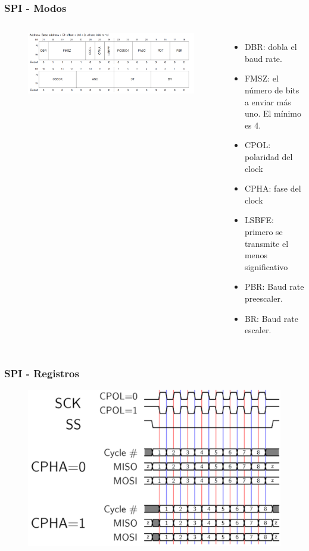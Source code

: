 \documentclass[10.5pt,scale=1.0,t,aspectratio=169,hyperref={pdfpagelabels=false}]{beamer}
\begin{document}
\begin{frame}
	\frametitle{SPI - Modos}
	{\small
	
		\begin{columns}
			\begin{figure}
				\centering
				\includegraphics[scale=0.25]{14_SPICTAR}
			\end{figure}
			
			\begin{itemize}
				\item DBR: dobla el baud rate.
				\item FMSZ: el número de bits a enviar más uno. El mínimo es 4.
				\item CPOL: polaridad del clock
				\item CPHA: fase del clock
				\item LSBFE: primero se transmite el menos significativo
				\item PBR: Baud rate preescaler.
				\item BR: Baud rate escaler.
			\end{itemize}
		\end{columns}
	}
\end{frame}
\begin{frame}
	\frametitle{SPI - Registros}
	{\small
			\begin{figure}
				\centering
				\includegraphics[scale=0.9]{16_SPIModos}
			\end{figure}		
	}
\end{frame}
\end{document}
